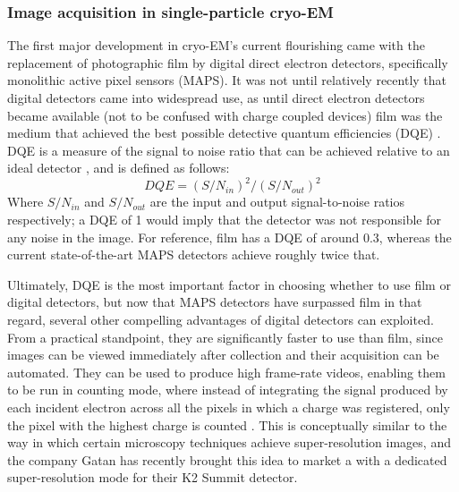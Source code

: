 \documentclass[a4paper,11pt,twoside,openright]{scrbook}
\begin{document}
\subsubsection{Image acquisition in single-particle cryo-EM}
The first major development in cryo-EM's current flourishing came with the replacement of photographic film by digital direct electron detectors, specifically monolithic active pixel sensors (MAPS). It was not until relatively recently that digital detectors came into widespread use, as until direct electron detectors became available (not to be confused with charge coupled devices) film was the medium that achieved the best possible detective quantum efficiencies (DQE) \cite{McMullan2009}. DQE is a measure of the signal to noise ratio that can be achieved relative to an ideal detector \cite{Dainty1975}, and is defined as follows:
\begin{displaymath}
    DQE = (S/N_{in})^{2}/(S/N_{out})^{2}
\end{displaymath}
Where \begin{math} S/N_{in} \end{math} and \begin{math} S/N_{out} \end{math} are the input and output signal-to-noise ratios respectively; a DQE of 1 would imply that the detector was not responsible for any noise in the image. For reference, film has a DQE of around 0.3, whereas the current state-of-the-art MAPS detectors achieve roughly twice that.

Ultimately, DQE is the most important factor in choosing whether to use film or digital detectors, but now that MAPS detectors have surpassed film in that regard, several other compelling advantages of digital detectors can exploited. From a practical standpoint, they are significantly faster to use than film, since images can be viewed immediately after collection and their acquisition can be automated. They can be used to produce high frame-rate videos, enabling them to be run in counting mode, where instead of integrating the signal produced by each incident electron across all the pixels in which a charge was registered, only the pixel with the highest charge is counted \cite{McMullan2009a}. This is conceptually similar to the way in which certain microscopy techniques achieve super-resolution images, and the company Gatan has recently brought this idea to market a with a dedicated super-resolution mode for their K2 Summit detector.
\end{document}
